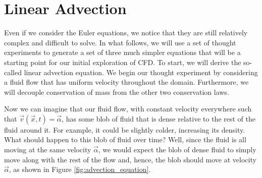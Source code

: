 \section{Linear Advection}
Even if we consider the Euler equations, we notice that they are still relatively complex and difficult to solve. In what follows, we will use a set of thought experiments to generate a set of three much simpler equations that will be a starting point for our initial exploration of CFD. To start, we will derive the so-called linear advection equation. We begin our thought experiment by considering a fluid flow that has uniform velocity throughout the domain. Furthermore, we will decouple conservation of mass from the other two conservation laws. 

Now we can imagine that our fluid flow, with constant velocity everywhere such that $\vec{v}(\vec{x},t) = \vec{\alpha}$, has some blob of fluid that is dense relative to the rest of the fluid around it. For example, it could be slightly colder, increasing its density. What should happen to this blob of fluid over time? Well, since the fluid is all moving at the same velocity $\vec{\alpha}$, we would expect the blob of dense fluid to simply move along with the rest of the flow and, hence, the blob should move at velocity $\vec{\alpha}$, as shown in Figure \ref{fig:advection_equation}.

